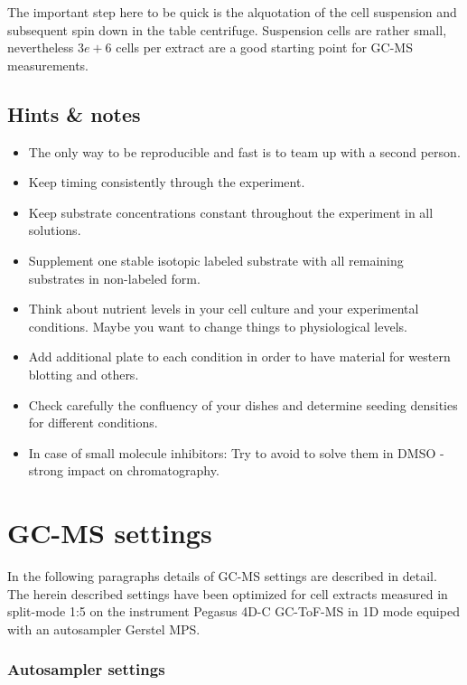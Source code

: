 \documentclass[]{book}
\providecommand{\tightlist}{%
  \setlength{\itemsep}{0pt}\setlength{\parskip}{0pt}}
\begin{document}
The important step here to be quick is the alquotation of the cell
suspension and subsequent spin down in the table centrifuge. Suspension
cells are rather small, nevertheless \(3e+6\) cells per extract are a
good starting point for GC-MS measurements.

\section{Hints \& notes}\label{hints-notes}

\begin{itemize}
\tightlist
\item
  The only way to be reproducible and fast is to team up with a second
  person.
\item
  Keep timing consistently through the experiment.
\item
  Keep substrate concentrations constant throughout the experiment in
  all solutions.
\item
  Supplement one stable isotopic labeled substrate with all remaining
  substrates in non-labeled form.
\item
  Think about nutrient levels in your cell culture and your experimental
  conditions. Maybe you want to change things to physiological levels.
\item
  Add additional plate to each condition in order to have material for
  western blotting and others.
\item
  Check carefully the confluency of your dishes and determine seeding
  densities for different conditions.
\item
  In case of small molecule inhibitors: Try to avoid to solve them in
  DMSO - strong impact on chromatography.
\end{itemize}

\chapter{GC-MS settings}\label{gcms}

In the following paragraphs details of GC-MS settings are described in
detail. The herein described settings have been optimized for cell
extracts measured in split-mode 1:5 on the instrument Pegasus 4D-C
GC-ToF-MS in 1D mode equiped with an autosampler Gerstel MPS.

\subsection{Autosampler settings}\label{autosampler-settings}
\end{document}
